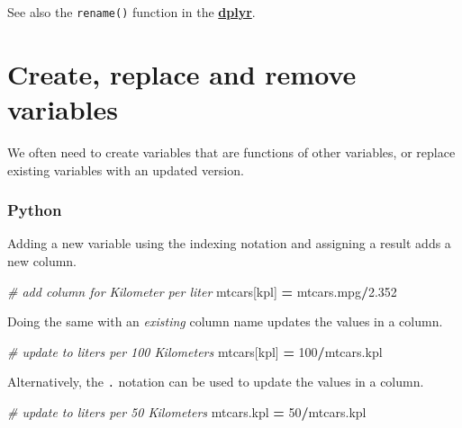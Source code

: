 \documentclass[
]{book}
\newenvironment{Shaded}{\begin{snugshade}}{\end{snugshade}}
\newcommand{\CommentTok}[1]{\textcolor[rgb]{0.56,0.35,0.01}{\textit{#1}}}
\newcommand{\DecValTok}[1]{\textcolor[rgb]{0.00,0.00,0.81}{#1}}
\newcommand{\FloatTok}[1]{\textcolor[rgb]{0.00,0.00,0.81}{#1}}
\newcommand{\NormalTok}[1]{#1}
\newcommand{\OperatorTok}[1]{\textcolor[rgb]{0.81,0.36,0.00}{\textbf{#1}}}
\newcommand{\StringTok}[1]{\textcolor[rgb]{0.31,0.60,0.02}{#1}}
\begin{document}
See also the \texttt{rename()} function in the \href{https://dplyr.tidyverse.org/}{\textbf{dplyr}}.

\hypertarget{create-replace-and-remove-variables}{%
\section{Create, replace and remove variables}\label{create-replace-and-remove-variables}}

We often need to create variables that are functions of other variables, or replace existing variables with an updated version.

\hypertarget{python-21}{%
\subsubsection*{Python}\label{python-21}}

Adding a new variable using the indexing notation and assigning a result adds a new column.

\begin{Shaded}
\begin{Highlighting}[]
\CommentTok{\# add column for Kilometer per liter}
\NormalTok{mtcars[}\StringTok{\textquotesingle{}kpl\textquotesingle{}}\NormalTok{] }\OperatorTok{=}\NormalTok{ mtcars.mpg}\OperatorTok{/}\FloatTok{2.352}
\end{Highlighting}
\end{Shaded}

Doing the same with an \emph{existing} column name updates the values in a column.

\begin{Shaded}
\begin{Highlighting}[]
\CommentTok{\# update to liters per 100 Kilometers}
\NormalTok{mtcars[}\StringTok{\textquotesingle{}kpl\textquotesingle{}}\NormalTok{] }\OperatorTok{=} \DecValTok{100}\OperatorTok{/}\NormalTok{mtcars.kpl }
\end{Highlighting}
\end{Shaded}

Alternatively, the \texttt{.} notation can be used to update the values in a column.

\begin{Shaded}
\begin{Highlighting}[]
\CommentTok{\# update to liters per 50 Kilometers}
\NormalTok{mtcars.kpl }\OperatorTok{=} \DecValTok{50}\OperatorTok{/}\NormalTok{mtcars.kpl }
\end{Highlighting}
\end{Shaded}
\end{document}
